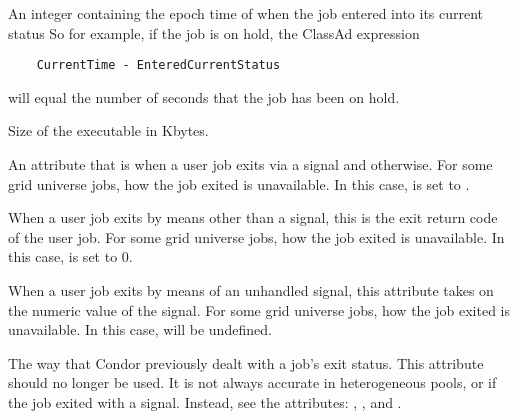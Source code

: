 \begin{description}
\item[\AdAttr{EnteredCurrentStatus}:]  An integer containing the
epoch time of when the job entered into its current status
So for example, if the job is on hold, the ClassAd expression
\begin{verbatim}
    CurrentTime - EnteredCurrentStatus
\end{verbatim}
will equal the number of seconds that the job has been on hold.

\item[\AdAttr{ExecutableSize}:]  Size of the executable in Kbytes.

\item[\AdAttr{ExitBySignal}:]  An attribute that is 
when a user job exits via a signal and  otherwise.
For some grid universe jobs, how the job exited is
unavailable. In this case,  is set to  .

\item[\AdAttr{ExitCode}:]  When a user job exits by means other than a signal,
this is the exit return code of the user job.
For some grid universe jobs, how the job exited is
unavailable. In this case,  is set to  0.

\item[\AdAttr{ExitSignal}:]  When a user job exits by means of an unhandled 
signal, this attribute takes on the numeric value of the signal.
For some grid universe jobs, how the job exited is
unavailable. In this case,  will be undefined.


\item[\AdAttr{ExitStatus}:]  The way that Condor previously dealt with
a job's exit status.
This attribute should no longer be used.
It is not always accurate in
heterogeneous pools, or if the job exited with a signal.
Instead, see the attributes: ,
, and
.


\end{description}
